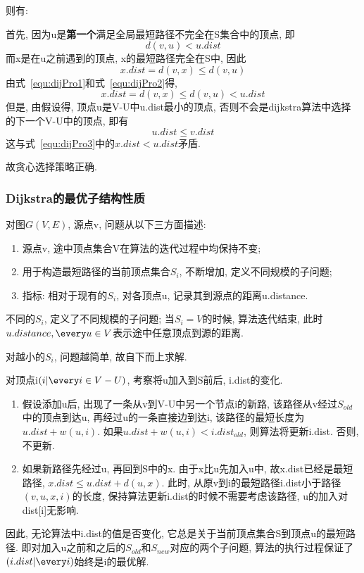 则有:\par
首先, 因为u是\textbf{第一个}满足全局最短路径不完全在S集合中的顶点, 即
\begin{equation}
	d(v, u) < u.dist
	\label{equ:dijPro1}
\end{equation}
而x是在u之前遇到的顶点, x的最短路径完全在S中, 因此
\begin{equation}
	x.dist = d(v, x) \leq d(v, u)
	\label{equ:dijPro2}
\end{equation}
由式~\ref{equ:dijPro1}和式~\ref{equ:dijPro2}得,
\begin{equation}
	x.dist = d(v, x) \leq d(v, u) < u.dist
	\label{eq:dijPro3}
\end{equation}
但是, 由假设得, 顶点u是V-U中u.dist最小的顶点,
否则不会是dijkstra算法中选择的下一个V-U中的顶点, 即有
\begin{equation}
	u.dist \leq v.dist
\end{equation}
这与式~\ref{equ:dijPro3}中的$x.dist < u.dist$矛盾.\par
故贪心选择策略正确.

\subsubsection{Dijkstra的最优子结构性质}
对图$G(V, E)$, 源点v, 问题从以下三方面描述:
\begin{enumerate}
	\item 源点v, 途中顶点集合V在算法的迭代过程中均保持不变;
	\item 用于构造最短路径的当前顶点集合$S_i$, 不断增加, 定义不同规模的子问题;
	\item 指标: 相对于现有的$S_i$, 对各顶点u, 记录其到源点的距离u.distance.
\end{enumerate}

不同的$S_i$, 定义了不同规模的子问题; 当$S_i = V$的时候, 算法迭代结束,
此时$u.distance, \every u \in V$表示途中任意顶点到源的距离.\par

对越小的$S_i$, 问题越简单, 故自下而上求解.\par

对顶点i$(i | \every i \in V-U)$, 考察将u加入到S前后, i.dist的变化.
\begin{enumerate}
	\item 假设添加u后, 出现了一条从v到V-U中另一个节点i的新路,
	      该路径从v经过$S_{old}$中的顶点到达u, 再经过u的一条直接边到达i,
	      该路径的最短长度为$u.dist + w(u, i)$. 如果$u.dist+w(u,i) <
		      i.dist_{old}$, 则算法将更新i.dist. 否则, 不更新.
	\item 如果新路径先经过u, 再回到S中的x. 由于x比u先加入u中,
	      故x.dist已经是最短路径, $x.dist \leq u.dist + d(u, x)$. 此时,
	      从原v到i的最短路径i.dist小于路径$(v,u,x,i)$的长度,
	      保持算法更新i.dist的时候不需要考虑该路径, u的加入对dist[i]无影响.
\end{enumerate}
因此, 无论算法中i.dist的值是否变化, 它总是关于当前顶点集合S到顶点u的最短路径.
即对加入u之前和之后的$S_{old}$和$S_{new}$对应的两个子问题,
算法的执行过程保证了$(i.dist | \every i)$始终是i的最优解.
